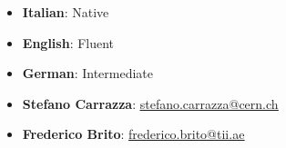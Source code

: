 \documentclass[9pt]{developercv} %
\begin{document}
\begin{itemize}[leftmargin=*, topsep=0pt]
\setlength\itemsep{0pt}
    \item \textbf{Italian}: Native
    \item \textbf{English}: Fluent
    \item \textbf{German}: Intermediate
\end{itemize}

	


\begin{itemize}[leftmargin=*, topsep=0pt]
\setlength\itemsep{0pt}
\item \textbf{Stefano Carrazza}: \href{mailto:stefano.carrazza@cern.ch}{\underline{stefano.carrazza@cern.ch}}
\item \textbf{Frederico Brito}: \href{mailto:frederico.brito@tii.ae}{\underline{frederico.brito@tii.ae}}
\end{itemize}
\end{document}
